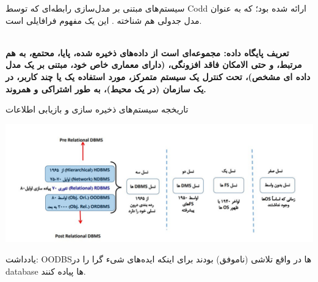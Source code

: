 \large{
سیستم‌های مبتنی بر مدل‌سازی رابطه‌ای که توسط Codd ارائه شده بود؛ که به عنوان مدل جدولی هم شناخته . این یک مفهوم فرافایلی است. 
}

\\

\textbf{
تعریف پایگاه داده: مجموعه‌ای است از داده‌های ذخیره شده، پایا، محتمع، به هم مرتبط، و حتی الامکان فاقد افزونگی، (دارای معماری خاص خود، مبتنی بر یک مدل داده ای مشخص)،  تحت کنترل یک سیستم متمرکز، مورد استفاده یک یا چند کاربر، در یک سازمان (در یک محیط)، به طور اشتراکی و همروند.
}

\large{تاریخجه سیستم‌های ذخیره سازی و بازیابی اطلاعات}

\graphicspath{ {./files/} }


 \includegraphics[scale=0.5]{1}


\large{
یادداشت: OODBSها در واقع تلاشی (ناموفق) بودند برای اینکه ایده‌های شیء گرا را در database ها پیاده کنند.
}

